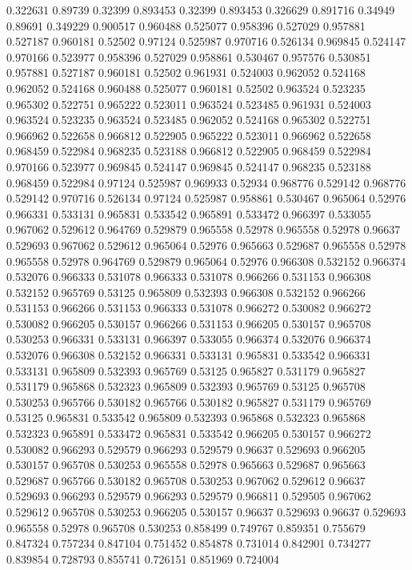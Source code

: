 0.322631 0.89739
0.32399 0.893453
0.32399 0.893453
0.326629 0.891716
0.34949 0.89691
0.349229 0.900517
0.960488 0.525077
0.958396 0.527029
0.957881 0.527187
0.960181 0.52502
0.97124 0.525987
0.970716 0.526134
0.969845 0.524147
0.970166 0.523977
0.958396 0.527029
0.958861 0.530467
0.957576 0.530851
0.957881 0.527187
0.960181 0.52502
0.961931 0.524003
0.962052 0.524168
0.962052 0.524168
0.960488 0.525077
0.960181 0.52502
0.963524 0.523235
0.965302 0.522751
0.965222 0.523011
0.963524 0.523485
0.961931 0.524003
0.963524 0.523235
0.963524 0.523485
0.962052 0.524168
0.965302 0.522751
0.966962 0.522658
0.966812 0.522905
0.965222 0.523011
0.966962 0.522658
0.968459 0.522984
0.968235 0.523188
0.966812 0.522905
0.968459 0.522984
0.970166 0.523977
0.969845 0.524147
0.969845 0.524147
0.968235 0.523188
0.968459 0.522984
0.97124 0.525987
0.969933 0.52934
0.968776 0.529142
0.968776 0.529142
0.970716 0.526134
0.97124 0.525987
0.958861 0.530467
0.965064 0.52976
0.966331 0.533131
0.965831 0.533542
0.965891 0.533472
0.966397 0.533055
0.967062 0.529612
0.964769 0.529879
0.965558 0.52978
0.965558 0.52978
0.96637 0.529693
0.967062 0.529612
0.965064 0.52976
0.965663 0.529687
0.965558 0.52978
0.965558 0.52978
0.964769 0.529879
0.965064 0.52976
0.966308 0.532152
0.966374 0.532076
0.966333 0.531078
0.966333 0.531078
0.966266 0.531153
0.966308 0.532152
0.965769 0.53125
0.965809 0.532393
0.966308 0.532152
0.966266 0.531153
0.966266 0.531153
0.966333 0.531078
0.966272 0.530082
0.966272 0.530082
0.966205 0.530157
0.966266 0.531153
0.966205 0.530157
0.965708 0.530253
0.966331 0.533131
0.966397 0.533055
0.966374 0.532076
0.966374 0.532076
0.966308 0.532152
0.966331 0.533131
0.965831 0.533542
0.966331 0.533131
0.965809 0.532393
0.965769 0.53125
0.965827 0.531179
0.965827 0.531179
0.965868 0.532323
0.965809 0.532393
0.965769 0.53125
0.965708 0.530253
0.965766 0.530182
0.965766 0.530182
0.965827 0.531179
0.965769 0.53125
0.965831 0.533542
0.965809 0.532393
0.965868 0.532323
0.965868 0.532323
0.965891 0.533472
0.965831 0.533542
0.966205 0.530157
0.966272 0.530082
0.966293 0.529579
0.966293 0.529579
0.96637 0.529693
0.966205 0.530157
0.965708 0.530253
0.965558 0.52978
0.965663 0.529687
0.965663 0.529687
0.965766 0.530182
0.965708 0.530253
0.967062 0.529612
0.96637 0.529693
0.966293 0.529579
0.966293 0.529579
0.966811 0.529505
0.967062 0.529612
0.965708 0.530253
0.966205 0.530157
0.96637 0.529693
0.96637 0.529693
0.965558 0.52978
0.965708 0.530253
0.858499 0.749767
0.859351 0.755679
0.847324 0.757234
0.847104 0.751452
0.854878 0.731014
0.842901 0.734277
0.839854 0.728793
0.855741 0.726151
0.851969 0.724004
